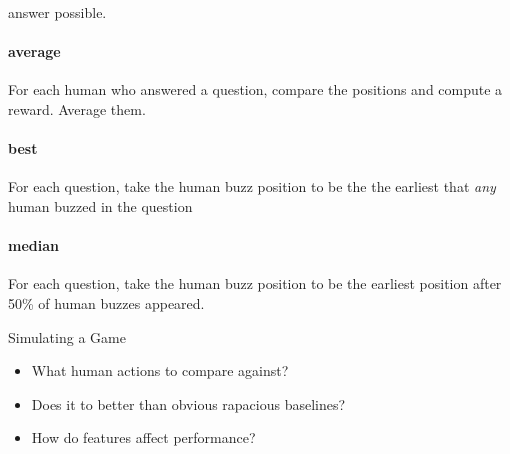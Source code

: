 \begin{frame}[t]
{  answer possible.}
 { \paragraph{average} For each human who answered a question, compare the positions and compute a reward.  Average them.}
 { \paragraph{best} For each question, take the human buzz position to be the the
  earliest that \emph{any} human buzzed in the question}
 { \paragraph{median} For each question, take the human buzz position to be the
  earliest position after 50\% of human buzzes appeared.}
\end{frame}


\else

\begin{frame}{Simulating a Game}

  \begin{itemize}
    \item What human actions to compare against?
     \item Does it to better than obvious rapacious baselines?
    \item How do features affect performance?
  \end{itemize}


\end{frame}


